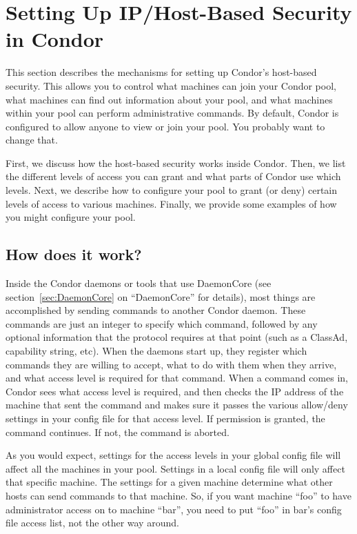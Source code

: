 \section{Setting Up IP/Host-Based Security in Condor}
\label{sec:Host-Security}

This section describes the mechanisms for setting up Condor's
host-based security.  This allows you to control what machines can
join your Condor pool, what machines can find out information about
your pool, and what machines within your pool can perform
administrative commands.  By default, Condor is configured to allow
anyone to view or join your pool.  You probably want to change that.

First, we discuss how the host-based security works inside Condor.
Then, we list the different levels of access you can grant and what
parts of Condor use which levels.  Next, we describe how to configure
your pool to grant (or deny) certain levels of access to various
machines.  Finally, we provide some examples of how you might
configure your pool.

\subsection{How does it work?}
\label{sec:How-Host-Security-Works}

Inside the Condor daemons or tools that use DaemonCore (see
section~\ref{sec:DaemonCore} on ``DaemonCore'' for details), most
things are accomplished by sending commands to another Condor daemon.
These commands are just an integer to specify which command, followed
by any optional information that the protocol requires at that point
(such as a ClassAd, capability string, etc).  When the daemons start
up, they register which commands they are willing to accept, what to
do with them when they arrive, and what access level is required for
that command.  When a command comes in, Condor sees what access level
is required, and then checks the IP address of the machine that sent
the command and makes sure it passes the various allow/deny settings
in your config file for that access level.  If permission is granted,
the command continues.  If not, the command is aborted.

As you would expect, settings for the access levels in your global
config file will affect all the machines in your pool.  Settings in a
local config file will only affect that specific machine.  The
settings for a given machine determine what other hosts can send
commands to that machine.  So, if you want machine ``foo'' to have
administrator access on to machine ``bar'', you need to put ``foo'' in
bar's config file access list, not the other way around.

